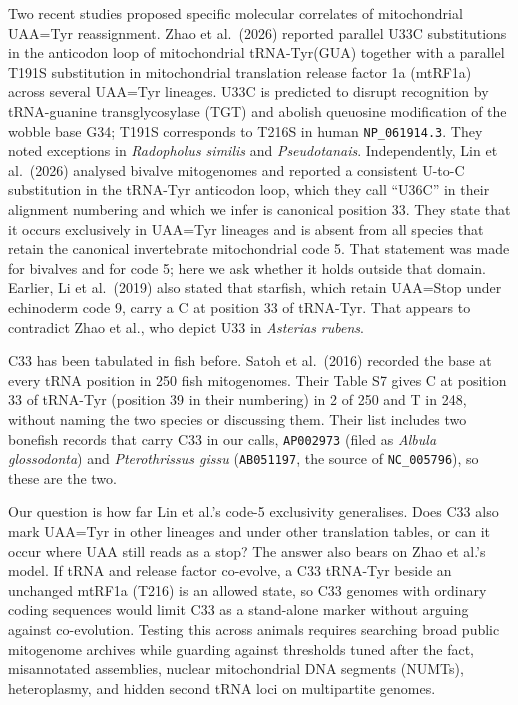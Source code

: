 \documentclass[11pt, a4paper]{article}
\begin{document}
Two recent studies proposed specific molecular correlates of mitochondrial UAA=Tyr reassignment. Zhao et al.\ (2026) reported parallel U33C substitutions in the anticodon loop of mitochondrial tRNA-Tyr(GUA) together with a parallel T191S substitution in mitochondrial translation release factor 1a (mtRF1a) across several UAA=Tyr lineages. U33C is predicted to disrupt recognition by tRNA-guanine transglycosylase (TGT) and abolish queuosine modification of the wobble base G34; T191S corresponds to T216S in human \texttt{NP\_061914.3}. They noted exceptions in \textit{Radopholus similis} and \textit{Pseudotanais}. Independently, Lin et al.\ (2026) analysed bivalve mitogenomes and reported a consistent U-to-C substitution in the tRNA-Tyr anticodon loop, which they call ``U36C'' in their alignment numbering and which we infer is canonical position 33. They state that it occurs exclusively in UAA=Tyr lineages and is absent from all species that retain the canonical invertebrate mitochondrial code 5. That statement was made for bivalves and for code 5; here we ask whether it holds outside that domain. Earlier, Li et al.\ (2019) also stated that starfish, which retain UAA=Stop under echinoderm code 9, carry a C at position 33 of tRNA-Tyr. That appears to contradict Zhao et al., who depict U33 in \textit{Asterias rubens}.

C33 has been tabulated in fish before. Satoh et al.\ (2016) recorded the base at every tRNA position in 250 fish mitogenomes. Their Table S7 gives C at position 33 of tRNA-Tyr (position 39 in their numbering) in 2 of 250 and T in 248, without naming the two species or discussing them. Their list includes two bonefish records that carry C33 in our calls, \texttt{AP002973} (filed as \textit{Albula glossodonta}) and \textit{Pterothrissus gissu} (\texttt{AB051197}, the source of \texttt{NC\_005796}), so these are the two.

Our question is how far Lin et al.'s code-5 exclusivity generalises. Does C33 also mark UAA=Tyr in other lineages and under other translation tables, or can it occur where UAA still reads as a stop? The answer also bears on Zhao et al.'s model. If tRNA and release factor co-evolve, a C33 tRNA-Tyr beside an unchanged mtRF1a (T216) is an allowed state, so C33 genomes with ordinary coding sequences would limit C33 as a stand-alone marker without arguing against co-evolution. Testing this across animals requires searching broad public mitogenome archives while guarding against thresholds tuned after the fact, misannotated assemblies, nuclear mitochondrial DNA segments (NUMTs), heteroplasmy, and hidden second tRNA loci on multipartite genomes.
\end{document}
